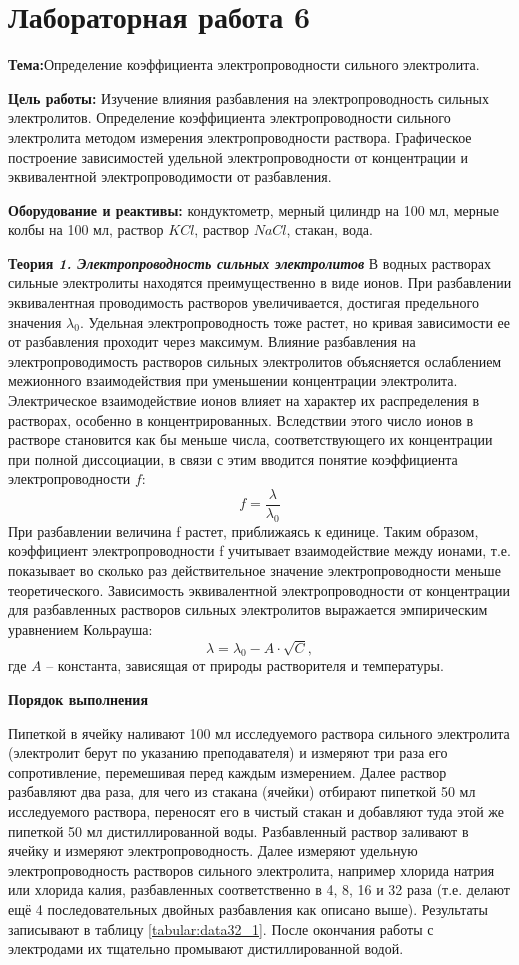 \section{Лабораторная работа 6 }
\textbf{Тема:}Определение коэффициента электропроводности сильного электролита.

\textbf{Цель работы:} Изучение влияния разбавления на электропроводность сильных электролитов. Определение коэффициента электропроводности сильного электролита методом измерения электропроводности раствора. Графическое построение зависимостей удельной электропроводности от концентрации и эквивалентной электропроводимости от разбавления. 


\textbf{Оборудование и реактивы:} кондуктометр, мерный цилиндр на 100 мл, мерные колбы на 100 мл, раствор $KCl$, раствор $NaCl$, стакан, вода.

\textbf{Теория}
\textit{\textbf{1. Электропроводность сильных электролитов }}
В водных растворах сильные электролиты находятся преимущественно в  виде  ионов.  При разбавлении эквивалентная проводимость растворов увеличивается,  достигая предельного  значения $\lambda_{0}$. Удельная электропроводность тоже растет, но кривая зависимости ее от разбавления проходит через максимум.  Влияние разбавления на электропроводимость растворов сильных электролитов объясняется ослаблением межионного  взаимодействия  при уменьшении  концентрации электролита. Электрическое взаимодействие ионов влияет на характер их распределения  в  растворах,  особенно   в   концентрированных. Вследствии этого  число  ионов в растворе становится как бы меньше числа, соответствующего их концентрации при полной диссоциации,  в связи с  этим  вводится понятие коэффициента электропроводности $f$:
$$f=\frac{\lambda}{\lambda_{0}}$$
При разбавлении величина f растет, приближаясь к единице. Таким образом,  коэффициент  электропроводности f учитывает взаимодействие между ионами, т.е. показывает во сколько раз действительное значение  электропроводности  меньше теоретического. Зависимость эквивалентной электропроводности от  концентрации для разбавленных растворов сильных электролитов выражается эмпирическим уравнением Кольрауша:
$$\lambda = \lambda_{0}-A\cdot\sqrt{C},$$
где $A$ -- константа, зависящая от природы растворителя и температуры.

\textbf{Порядок выполнения}

Пипеткой в ячейку наливают 100 мл исследуемого раствора сильного  электролита (электролит берут по  указанию  преподавателя)  и измеряют три раза его сопротивление,  перемешивая перед каждым измерением. Далее раствор разбавляют два раза,  для чего из  стакана (ячейки) отбирают пипеткой 50 мл исследуемого раствора,  переносят его в чистый стакан и добавляют туда этой же пипеткой 50 мл дистиллированной воды. Разбавленный раствор заливают в ячейку и измеряют электропроводность.
Далее измеряют  удельную электропроводность  растворов сильного электролита, например хлорида натрия или хлорида калия,  разбавленных соответственно в 4,  8, 16 и 32 раза (т.е. делают ещё 4 последовательных двойных разбавления  как описано  выше).  Результаты записывают в таблицу \ref{tabular:data32_1}. 
После окончания  работы  с электродами их тщательно промывают дистиллированной водой.

